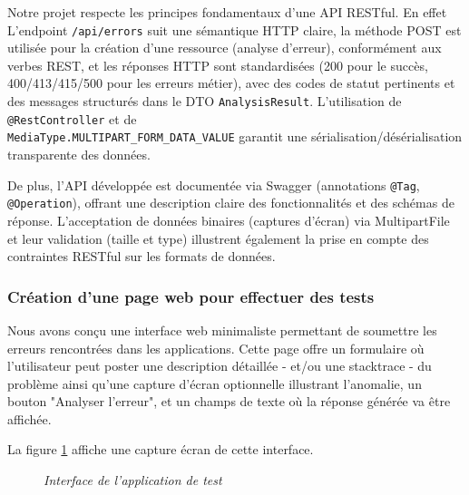 \documentclass[12pt,a4paper]{report}
\begin{document}
	Notre projet respecte les principes fondamentaux d'une API RESTful. En effet L'endpoint \verb|/api/errors| suit une sémantique HTTP claire, la méthode POST est utilisée pour la création d'une ressource (analyse d'erreur), conformément aux verbes REST, et les réponses HTTP sont standardisées (200 pour le succès, 400/413/415/500 pour les erreurs métier), avec des codes de statut pertinents et des messages structurés dans le DTO \verb|AnalysisResult|. L'utilisation de \verb|@RestController| et de \\ \verb|MediaType.MULTIPART_FORM_DATA_VALUE| garantit une sérialisation/désérialisation transparente des données.
	
	De plus, l'API développée est documentée via Swagger (annotations \verb|@Tag|, \verb|@Operation|), offrant une description claire des fonctionnalités et des schémas de réponse. L'acceptation de données binaires (captures d'écran) via MultipartFile et leur validation (taille et type) illustrent également la prise en compte des contraintes RESTful sur les formats de données.
	
	\subsubsection{Création d'une page web pour effectuer des tests}
	
	Nous avons conçu une interface web minimaliste permettant de soumettre les erreurs rencontrées dans les applications. Cette page offre un formulaire où l'utilisateur peut poster une description détaillée - et/ou une stacktrace  - du problème ainsi qu’une capture d’écran optionnelle illustrant l’anomalie, un bouton "Analyser l'erreur", et un champs de texte où la réponse générée va être affichée.
	
	La figure \ref{fig:interface} affiche une capture écran de cette interface.
	
	\begin{figure}[H]
		\centering
		\caption{\textit{Interface de l'application de test}}
		\label{fig:interface}
	\end{figure}
	
\end{document}
